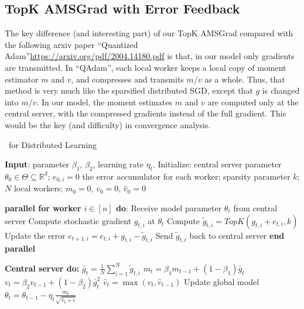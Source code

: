 \documentclass[11pt]{article}
\begin{document}
\subsection{TopK AMSGrad with Error Feedback}




The key difference (and interesting part) of our TopK AMSGrad compared with the following arxiv paper ``Quantized Adam''\url{https://arxiv.org/pdf/2004.14180.pdf} is that, in our model only gradients are transmitted. In ``QAdam'', each local worker keeps a local copy of moment estimator $m$ and $v$, and compresses and transmits $m/v$ as a whole. Thus, that method is very much like the sparsified distributed SGD, except that $g$ is changed into $m/v$. In our model, the moment estimates $m$ and $v$ are computed only at the central server, with the compressed gradients instead of the full gradient. This would be the key (and difficulty) in convergence analysis.


\begin{algorithm}[H]
\caption{\algo\ for Distributed Learning} \label{alg:sparsams}
\begin{algorithmic}[1]

\STATE \textbf{Input}: parameter $\beta_1$, $\beta_2$, learning rate $\eta_t$. 
\STATE Initialize: central server parameter $\theta_{0} \in \Theta \subseteq \mathbb R^d$; $e_{0,i}=0$ the error accumulator for each worker; sparsity parameter $k$; $N$ local workers; $m_0=0$, $v_0=0$, $\hat v_0=0$


\STATE\textbf{parallel for worker $i \in [n]$ do}:
\STATE\quad  Receive model parameter $\theta_{t}$ from central server
\STATE\quad  Compute stochastic gradient $g_{t,i}$ at $\theta_t$
\STATE\quad  Compute $\tilde g_{t,i}=TopK(g_{t,i}+e_{t,i},k)$ \label{line:topk} \label{line:quantize}
\STATE\quad  Update the error $e_{t+1,i}=e_{t,i}+g_{t,i}-\tilde g_{t,i}$
\STATE\quad  Send $\tilde g_{t,i}$ back to central server
\STATE \textbf{end parallel}

\STATE \textbf{Central server do:}
\STATE $\bar g_{t}=\frac{1}{N}\sum_{i=1}^N \tilde g_{t,i}$
\STATE $m_t=\beta_1 m_{t-1}+(1-\beta_1)\bar g_t$
\STATE $v_t=\beta_2 v_{t-1}+(1-\beta_2)\bar g_t^2$
\STATE $\hat v_t=\max(v_t,\hat v_{t-1})$ \label{line:v}
\STATE Update global model $\theta_t=\theta_{t-1}-\eta_t\frac{m_t}{\sqrt{\hat v_t+\epsilon}}$

\ENDFOR
\end{algorithmic}
\end{algorithm}
\end{document}

